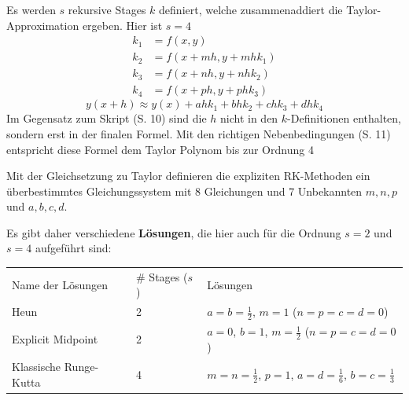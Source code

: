 \newpage
      Es werden $s$ rekursive Stages $k$ definiert, welche zusammenaddiert die Taylor-Approximation ergeben.
      Hier ist $s=4$
      \begin{align*}
        k_1 &= f(x,y)\\
        k_2 &= f(x + m h, y+m h k_1)\\
        k_3 &= f(x + n h, y+n h  k_2)\\
        k_4 &= f(x + p h, y+p h k_3) 
      \end{align*}     
      $$y(x+h) \approx y(x) + a h k_1 + b h k_2 + c h k_3 + d h k_4 $$ 
      Im Gegensatz zum Skript (S. 10) sind die 
      $h$ nicht in den $k$-Definitionen enthalten, sondern erst in der finalen Formel. Mit den richtigen Nebenbedingungen (S. 11) 
      entspricht diese Formel dem Taylor Polynom bis zur Ordnung 4
      
      Mit der Gleichsetzung zu Taylor definieren die expliziten RK-Methoden ein 
      überbestimmtes Gleichungssystem mit 8 Gleichungen und 7 Unbekannten $m,n,p$ und $a,b,c,d$.
      
      Es gibt daher verschiedene \textbf{Lösungen}, die hier auch für die Ordnung $s=2$ und $s=4$ aufgeführt sind:\\
      \begin{tabular}{lll}
        Name der Lösungen & \# Stages ($s$) & Lösungen\\
        Heun & 2 & $a=b=\frac12$, $m=1$ ($n=p=c=d=0$)\\
        Explicit Midpoint & 2 & $a=0$, $b=1$, $m=\frac12$ ($n=p=c=d=0$)\\
        Klassische Runge-Kutta & 4 & $m=n=\frac12$, $p=1$, $a=d=\frac16$, $b=c=\frac13$
      \end{tabular}
    
